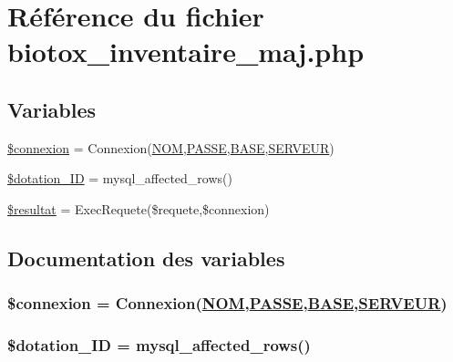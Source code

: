 \hypertarget{biotox__inventaire__maj_8php}{
\section{R\'{e}f\'{e}rence du fichier biotox\_\-inventaire\_\-maj.php}
\label{biotox__inventaire__maj_8php}
}
\subsection*{Variables}
\begin{CompactItemize}
\item 
\hyperlink{biotox__inventaire__maj_8php_a0}{\$connexion} = Connexion(\hyperlink{pma__connect_8php_a0}{NOM},\hyperlink{pma__connect_8php_a1}{PASSE},\hyperlink{pma__connect_8php_a3}{BASE},\hyperlink{pma__connect_8php_a2}{SERVEUR})
\item 
\hyperlink{biotox__inventaire__maj_8php_a1}{\$dotation\_\-ID} = mysql\_\-affected\_\-rows()
\item 
\hyperlink{biotox__inventaire__maj_8php_a2}{\$resultat} = Exec\-Requete(\$requete,\$connexion)
\end{CompactItemize}


\subsection{Documentation des variables}
\hypertarget{biotox__inventaire__maj_8php_a0}{
\subsubsection[\$connexion]{\setlength{\rightskip}{0pt plus 5cm}\$connexion = Connexion(\hyperlink{pma__connect_8php_a0}{NOM},\hyperlink{pma__connect_8php_a1}{PASSE},\hyperlink{pma__connect_8php_a3}{BASE},\hyperlink{pma__connect_8php_a2}{SERVEUR})}}
\label{biotox__inventaire__maj_8php_a0}


\hypertarget{biotox__inventaire__maj_8php_a1}{
\subsubsection[\$dotation\_\-ID]{\setlength{\rightskip}{0pt plus 5cm}\$dotation\_\-ID = mysql\_\-affected\_\-rows()}}
\label{biotox__inventaire__maj_8php_a1}


